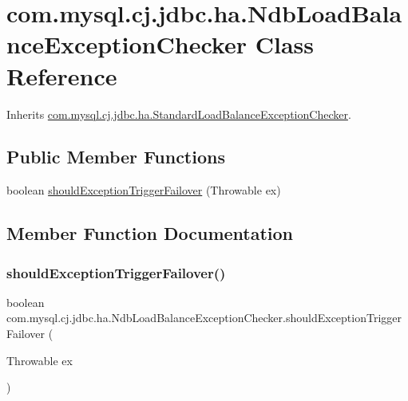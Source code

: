 \hypertarget{classcom_1_1mysql_1_1cj_1_1jdbc_1_1ha_1_1_ndb_load_balance_exception_checker}{}\section{com.\+mysql.\+cj.\+jdbc.\+ha.\+Ndb\+Load\+Balance\+Exception\+Checker Class Reference}
\label{classcom_1_1mysql_1_1cj_1_1jdbc_1_1ha_1_1_ndb_load_balance_exception_checker}


Inherits \mbox{\hyperlink{classcom_1_1mysql_1_1cj_1_1jdbc_1_1ha_1_1_standard_load_balance_exception_checker}{com.\+mysql.\+cj.\+jdbc.\+ha.\+Standard\+Load\+Balance\+Exception\+Checker}}.

\subsection*{Public Member Functions}
\begin{DoxyCompactItemize}
\item 
boolean \mbox{\hyperlink{classcom_1_1mysql_1_1cj_1_1jdbc_1_1ha_1_1_ndb_load_balance_exception_checker_ace9aa78b697232aab5423f06dd998f82}{should\+Exception\+Trigger\+Failover}} (Throwable ex)
\end{DoxyCompactItemize}


\subsection{Member Function Documentation}
\mbox{\label{classcom_1_1mysql_1_1cj_1_1jdbc_1_1ha_1_1_ndb_load_balance_exception_checker_ace9aa78b697232aab5423f06dd998f82}} 
\subsubsection{\texorpdfstring{should\+Exception\+Trigger\+Failover()}{shouldExceptionTriggerFailover()}}
{\footnotesize\ttfamily boolean com.\+mysql.\+cj.\+jdbc.\+ha.\+Ndb\+Load\+Balance\+Exception\+Checker.\+should\+Exception\+Trigger\+Failover (\begin{DoxyParamCaption}\item[{Throwable}]{ex }\end{DoxyParamCaption})}

